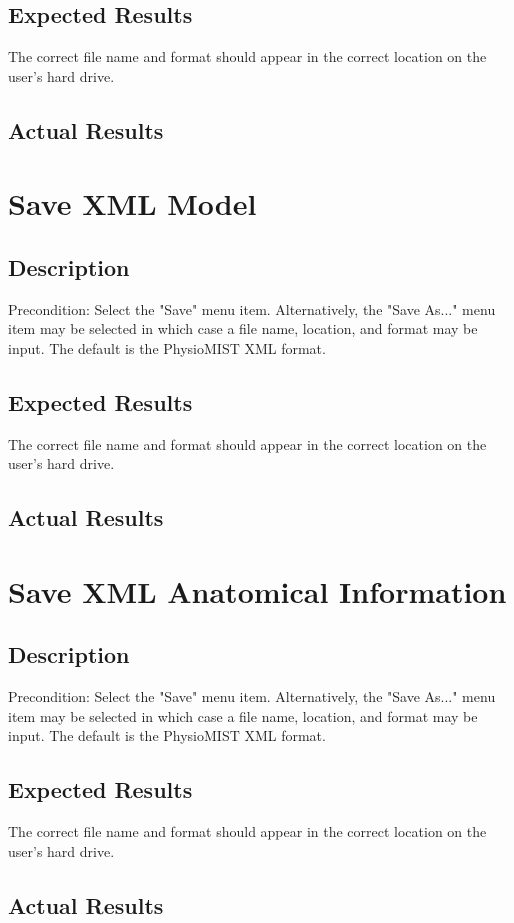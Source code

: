 \documentclass{article}
\begin{document}
\subsection{Expected Results}
The correct file name and format should appear in the correct location on the user's hard drive.
\subsection{Actual Results}

\section{Save XML Model}
\subsection{Description}
Precondition: Select the "Save" menu item.  Alternatively, the "Save As..." menu item may be selected in which case a file name, location, and format may be input.  The default is the PhysioMIST XML format.
\subsection{Expected Results}
The correct file name and format should appear in the correct location on the user's hard drive.
\subsection{Actual Results}

\section{Save XML Anatomical Information}
\subsection{Description}
Precondition: Select the "Save" menu item.  Alternatively, the "Save As..." menu item may be selected in which case a file name, location, and format may be input.  The default is the PhysioMIST XML format.
\subsection{Expected Results}
The correct file name and format should appear in the correct location on the user's hard drive.
\subsection{Actual Results}
\end{document}
